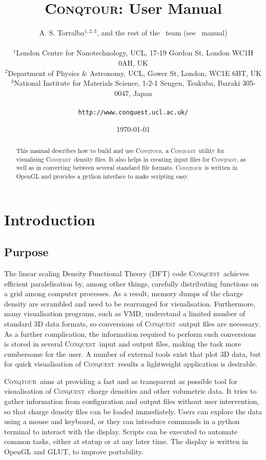 \documentclass[a4paper,notitlepage,11pt]{article}
\title{\textsc{Conqtour}: User Manual}
\author{A. S. Torralba$^{1,2,3}$, and the rest of the \CQ\ team (see \CQ\ manual)\\
~\\
$^1$London Centre for Nanotechnology, UCL, 17-19 Gordon St, London WC1H
0AH, UK\\
$^2$Department of Physics \& Astronomy, UCL, Gower St, London, WC1E 6BT,
UK\\ 
$^3$National Institute for Materials Science, 1-2-1 Sengen, Tsukuba,
Ibaraki 305-0047, Japan\\
~\\
\texttt{http://www.conquest.ucl.ac.uk/}}
\date{\today}
\def\CQ{\textsc{Conquest}}
\def\Conqtour{\textsc{Conqtour}}
\begin{document}
\thispagestyle{plain}
\maketitle
\begin{abstract}
This manual describes how to build and use \Conqtour, a \CQ\ utility
for visualising \CQ\ density files. It also helps in creating input files 
for \CQ, as well as in converting between several standard file formats.
\Conqtour\ is written in OpenGL and provides a python interface to make
scripting easy.
\end{abstract}
\tableofcontents

\pagebreak

\section{Introduction}
\label{sec:introduction}

\subsection{Purpose}
\label{sec:purpose}

The linear scaling Density Functional Theory (DFT) code \CQ\ achieves efficient paralelisation 
by, among other things, carefully distributing functions on a grid among computer processes. As a result, memory dumps
of the charge density are scrambled and need to be rearranged for visualisation. Furthermore, 
many visualisation programs, such as VMD, understand a limited number of standard 3D data formats, 
so conversions of \CQ\ output files are necessary. As a further complication,
the information required to perform such conversions is stored in several \CQ\ input and output files, 
making the task more cumbersome for the user. A number of external tools exist that plot 3D data, 
but for quick visualisation of \CQ\ results a lightweight application is desirable.

\Conqtour\ aims at providing a fast and as transparent as possible tool for visualisation of 
\CQ\ charge densities and other volumetric data. It tries to gather information from configuration
and output files without user intervention, so that charge density files can be loaded immediately.
Users can explore the data using a mouse and keyboard, or they can introduce commands in a python 
terminal to interact with the display. Scripts can be executed to automate common tasks, either at statup
or at any later time. The display is written in OpenGL and GLUT, to improve portability.
\end{document}
